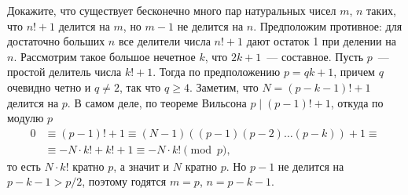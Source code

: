 \problem
Докажите, что существует бесконечно много пар натуральных чисел $m$, $n$ таких,
что $n! + 1$ делится на $m$, но $m - 1$ не делится на $n$.
\solution
Предположим противное: для достаточно больших $n$ все делители числа $n! + 1$
дают остаток 1 при делении на $n$.
Рассмотрим такое большое нечетное $k$, что $2 k + 1$~--- составное.
Пусть $p$~--- простой делитель числа $k! + 1$.
Тогда по предположению $p = q k + 1$, причем $q$ очевидно четно и $q \neq 2$,
так что $q \geq 4$.
Заметим, что $N = (p - k - 1)! + 1$ делится на $p$.
В самом деле, по теореме Вильсона $p \mid (p - 1)! + 1$, откуда по модулю $p$
\begin{align*}
    0
&\equiv
    (p - 1)! + 1
\equiv
    (N - 1) ((p - 1) (p - 2) \ldots (p - k)) + 1
\equiv\\&\equiv
    -N \cdot k! + k! + 1
\equiv
    -N \cdot k!
\pmod{p},
\end{align*}
то есть $N \cdot k!$ кратно $p$, а значит и $N$ кратно $p$.
Но $p - 1$ не делится на $p - k - 1 > p / 2$, поэтому годятся
$m = p$, $n = p - k - 1$.
\endproblem
